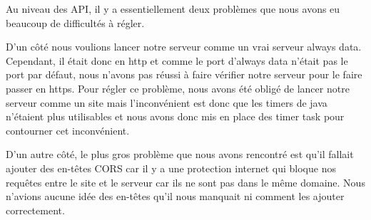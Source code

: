 \begin{flushleft}
Au niveau des API, il y a essentiellement deux problèmes que nous avons eu beaucoup de difficultés à régler.
\end{flushleft}

\begin{flushleft}
D'un côté nous voulions lancer notre serveur comme un vrai serveur always data. Cependant, il était donc en http et comme le port d'always data n'était pas le port par défaut, nous n'avons pas réussi à faire vérifier notre serveur pour le faire passer en https. Pour régler ce problème, nous avons été obligé de lancer notre serveur comme un site mais l'inconvénient est donc que les timers de java n'étaient plus utilisables et nous avons donc mis en place des timer task pour contourner cet inconvénient.
\end{flushleft}

\begin{flushleft}
D'un autre côté, le plus gros problème que nous avons rencontré est qu'il fallait ajouter des en-têtes CORS car il y a une protection internet qui bloque nos requêtes entre le site et le serveur car ils ne sont pas dans le même domaine. Nous n'avions aucune idée des en-têtes qu'il nous manquait ni comment les ajouter correctement.
\end{flushleft}


